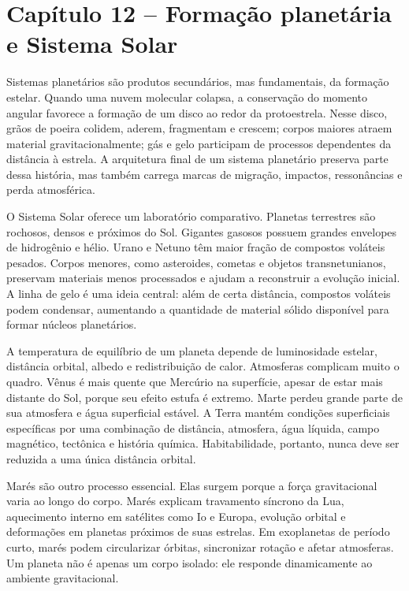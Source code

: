 \documentclass[11pt,a4paper]{article}
\begin{document}
\section*{Capítulo 12 -- Formação planetária e Sistema Solar}
Sistemas planetários são produtos secundários, mas fundamentais, da formação estelar. Quando uma nuvem molecular colapsa, a conservação do momento angular favorece a formação de um disco ao redor da protoestrela. Nesse disco, grãos de poeira colidem, aderem, fragmentam e crescem; corpos maiores atraem material gravitacionalmente; gás e gelo participam de processos dependentes da distância à estrela. A arquitetura final de um sistema planetário preserva parte dessa história, mas também carrega marcas de migração, impactos, ressonâncias e perda atmosférica.

O Sistema Solar oferece um laboratório comparativo. Planetas terrestres são rochosos, densos e próximos do Sol. Gigantes gasosos possuem grandes envelopes de hidrogênio e hélio. Urano e Netuno têm maior fração de compostos voláteis pesados. Corpos menores, como asteroides, cometas e objetos transnetunianos, preservam materiais menos processados e ajudam a reconstruir a evolução inicial. A linha de gelo é uma ideia central: além de certa distância, compostos voláteis podem condensar, aumentando a quantidade de material sólido disponível para formar núcleos planetários.

A temperatura de equilíbrio de um planeta depende de luminosidade estelar, distância orbital, albedo e redistribuição de calor. Atmosferas complicam muito o quadro. Vênus é mais quente que Mercúrio na superfície, apesar de estar mais distante do Sol, porque seu efeito estufa é extremo. Marte perdeu grande parte de sua atmosfera e água superficial estável. A Terra mantém condições superficiais específicas por uma combinação de distância, atmosfera, água líquida, campo magnético, tectônica e história química. Habitabilidade, portanto, nunca deve ser reduzida a uma única distância orbital.

Marés são outro processo essencial. Elas surgem porque a força gravitacional varia ao longo do corpo. Marés explicam travamento síncrono da Lua, aquecimento interno em satélites como Io e Europa, evolução orbital e deformações em planetas próximos de suas estrelas. Em exoplanetas de período curto, marés podem circularizar órbitas, sincronizar rotação e afetar atmosferas. Um planeta não é apenas um corpo isolado: ele responde dinamicamente ao ambiente gravitacional.
\end{document}
